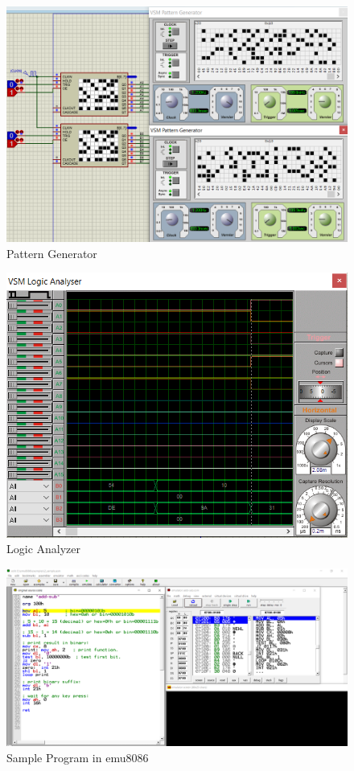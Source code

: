 \documentclass[11pt]{article}
\begin{document}
\begin{figure}[h!]
        \centering
        \includegraphics[width=12cm]{Pattern.png}
        \caption{Pattern Generator}
        \label{fig:Pattern}
\end{figure}

\begin{figure}[h!]
        \centering
        \includegraphics[width=12cm]{Analyze.png}
        \caption{Logic Analyzer}
        \label{fig:Analyze}
\end{figure}

\begin{figure}[h!]
        \centering
        \includegraphics[width=17cm]{emu8086.png}
        \caption{Sample Program in emu8086}
        \label{fig:emu8086}
\end{figure}
\end{document}
